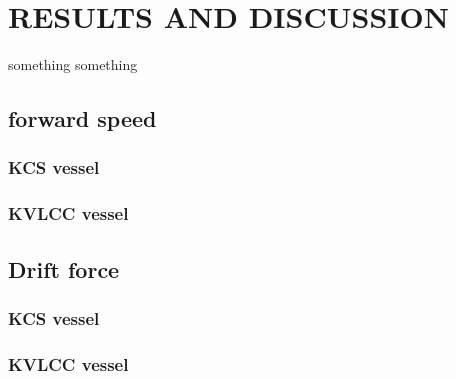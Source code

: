 \chapter{RESULTS AND DISCUSSION}
something something
\section{forward speed}
\subsection{KCS vessel}
\subsection{KVLCC vessel}
\section{Drift force}
\subsection{KCS vessel}
\subsection{KVLCC vessel}
